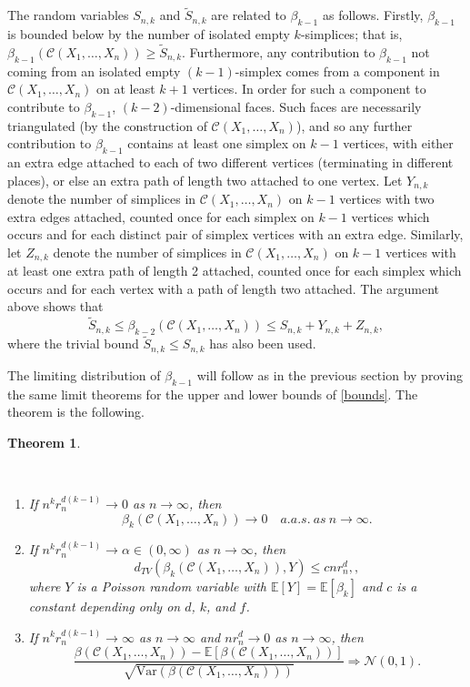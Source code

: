 \documentclass{amsart}
\newtheorem{thm}{Theorem}[section]
\theoremstyle{definition}
\newcommand{\E}{\mathbb{E}}
\newcommand{\var}{\mathrm{Var}}
\newcommand{\s}{\widetilde{S}}
\renewcommand{\1}{\mathbb{1}}
\begin{document}
The random variables $S_{n,k}$ and $\s_{n,k}$ are related to $\beta_{k-1}$
as follows.  Firstly,
$\beta_{k-1}$ is bounded below by the number of isolated empty
$k$-simplices; that is, $\beta_{k-1}(\mathcal{C}(X_1,\ldots,X_n))\ge
\s_{n,k}.$ Furthermore, any contribution to $\beta_{k-1}$ not coming
from an isolated empty $( k-1)$-simplex comes from a component in
$\mathcal{C}(X_1,\ldots,X_n)$ on at least $k+1$ vertices.  In order
for such a component to contribute to $\beta_{k-1}$, $(k-2)$-dimensional faces. Such faces are
necessarily triangulated (by the construction of
$\mathcal{C}(X_1,\ldots,X_n)$), and so any further contribution to
$\beta_{k-1}$ contains at least one simplex on $k-1$ vertices, with
either an extra edge attached to each of two different vertices
(terminating in different places), or else an extra path of length two
attached to one vertex. 
Let $Y_{n,k}$ denote the number of
simplices in $\mathcal{C}(X_1,\ldots,X_n)$ on $k-1$ vertices with two extra
edges attached, counted once for each simplex on $k-1$ vertices which occurs 
and for each distinct pair of simplex vertices with an extra edge.  
Similarly, let $Z_{n,k}$ denote the number of
simplices in $\mathcal{C}(X_1,\ldots,X_n)$ on $k-1$ vertices with at
least one extra path of length 2 attached, counted once for each simplex which
occurs and for each vertex with a path of length two attached.  
The argument above shows that
\begin{equation}\label{bounds}
\s_{n,k}\le\beta_{k-2}(\mathcal{C}(X_1,\ldots,X_n))\le S_{n,k}+Y_{n,k}+Z_{n,k},
\end{equation}
where the trivial bound $\s_{n,k}\le S_{n,k}$ has also been used.

The limiting distribution of $\beta_{k-1}$ will follow as in the previous
section by proving the same
limit theorems for the upper and lower bounds of \eqref{bounds}.  The theorem
is the following.

\begin{thm}\label{CC_clt}

\

\begin{enumerate}
\item \label{CC_clt_zero}If $n^kr_n^{d(k-1)}\to0$ as $n\to\infty$, then 
$$\beta_k(\mathcal{C}(X_1,\ldots,X_n))\rightarrow0\quad a.a.s.\ as\ n\to\infty.$$

\item \label{CC_clt_poisson}If $n^kr_n^{d(k-1)}\to\alpha\in(0,\infty)$ as $n\to\infty$, then
$$d_{TV}(\beta_k(\mathcal{C}(X_1,\ldots,X_n)),Y)\le cnr_n^d,,$$
where $Y$ is a Poisson random variable with $\E[Y]=\E[\beta_k]$ and $c$
is a constant depending only on $d$, $k$, and $f$.

\item \label{CC_clt_normal}If $n^kr_n^{d(k-1)}\to\infty$ as $n\to\infty$ and $nr_n^d\to0$ as $n\to\infty$,
then
$$\frac{\beta(\mathcal{C}(X_1,\ldots,X_n))-\E[\beta(\mathcal{C}(X_1,\ldots,X_n))]}{
\sqrt{\var(\beta(\mathcal{C}(X_1,\ldots,X_n)))}}\Rightarrow\mathcal{N}(0,1).$$

\end{enumerate}
\end{thm}
\end{document}

